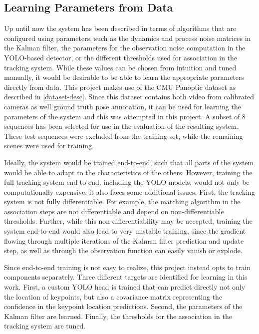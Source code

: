 \subsection{Learning Parameters from Data} \label{arch-learning}

Up until now the system has been described in terms of algorithms that are configured using parameters, such as the dynamics and process noise matrices in the Kalman filter, the parameters for the observation noise computation in the YOLO-based detector, or the different thresholds used for association in the tracking system. While these values can be chosen from intuition and tuned manually, it would be desirable to be able to learn the appropriate parameters directly from data. This project makes use of the CMU Panoptic dataset as described in \cref{dataset-desc}. Since this dataset contains both video from calibrated cameras as well ground truth pose annotation, it can be used for learning the parameters of the system and this was attempted in this project. A subset of 8 sequences has been selected for use in the evaluation of the resulting system. These test sequences were excluded from the training set, while the remaining scenes were used for training.

Ideally, the system would be trained end-to-end, such that all parts of the system would be able to adapt to the characteristics of the others. However, training the full tracking system end-to-end, including the YOLO models, would not only be computationally expensive, it also faces some additional issues. First, the tracking system is not fully differentiable. For example, the matching algorithm in the association steps are not differentiable and depend on non-differentiable thresholds. Further, while this non-differentiability may be accepted, training the system end-to-end would also lead to very unstable training, since the gradient flowing through multiple iterations of the Kalman filter prediction and update step, as well as through the observation function can easily vanish or explode.

Since end-to-end training is not easy to realize, this project instead opts to train components separately. Three different targets are identified for learning in this work. First, a custom YOLO head is trained that can predict directly not only the location of keypoints, but also a covariance matrix representing the confidence in the keypoint location predictions. Second, the parameters of the Kalman filter are learned. Finally, the thresholds for the association in the tracking system are tuned.


